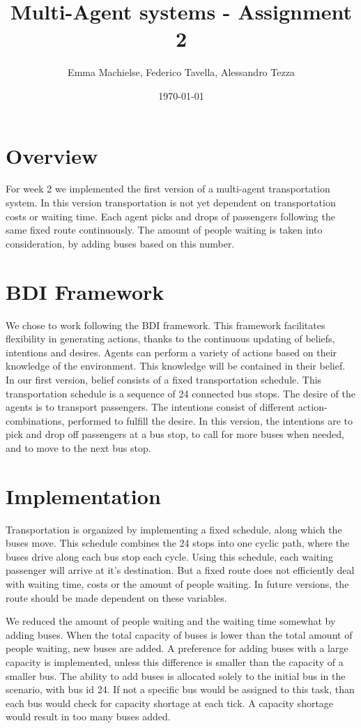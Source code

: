 \documentclass[a4paper]{article}
\title{Multi-Agent systems - Assignment 2}
\author{Emma Machielse, Federico Tavella, Alessandro Tezza}
\date{\today}
\begin{document}
\maketitle

\section{Overview}
For week 2 we implemented the first version of a multi-agent transportation system. In this version transportation is not yet dependent on transportation costs or waiting time. Each agent picks and drops of passengers following the same fixed route continuously. The amount of people waiting is taken into consideration, by adding buses based on this number.

\section{BDI Framework}

We chose to work following the BDI framework. This framework facilitates flexibility in generating actions, thanks to the continuous updating of beliefs, intentions and desires. Agents can perform a variety of actions based on their knowledge of the environment. This knowledge will be contained in their belief. In our first version, belief consists of a fixed transportation schedule. This transportation schedule is a sequence of 24 connected bus stops. The desire of the agents is to transport passengers. The intentions consist of different action-combinations, performed to fulfill the desire. In this version, the intentions are to pick and drop off passengers at a bus stop, to call for more buses when needed, and to move to the next bus stop.

\section{Implementation}

Transportation is organized by implementing a fixed schedule, along which the buses move. This schedule combines the 24 stops into one cyclic path, where the buses drive along each bus stop each cycle. Using this schedule, each waiting passenger will arrive at it's destination. But a fixed route does not efficiently deal with waiting time, costs or the amount of people waiting. In future versions, the route should be made dependent on these variables.

We reduced the amount of people waiting and the waiting time somewhat by adding buses. When the total capacity of buses is lower than the total amount of people waiting, new buses are added. A preference for adding buses with a large capacity is implemented, unless this difference is smaller than the capacity of a smaller bus. The ability to add buses is allocated solely to the initial bus in the scenario, with bus id 24. If not a specific bus would be assigned to this task, than each bus would check for capacity shortage at each tick. A capacity shortage would result in too many buses added. 
\end{document}
